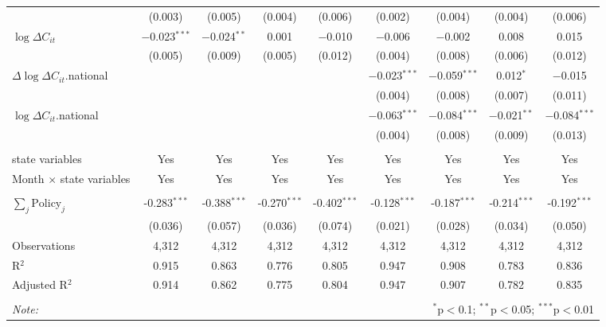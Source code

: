\begin{tabular}{@{\extracolsep{1pt}}lcccccccc}
  & (0.003) & (0.005) & (0.004) & (0.006) & (0.002) & (0.004) & (0.004) & (0.006) \\ 
  $\log \Delta C_{it}$ & $-$0.023$^{***}$ & $-$0.024$^{**}$ & 0.001 & $-$0.010 & $-$0.006 & $-$0.002 & 0.008 & 0.015 \\ 
  & (0.005) & (0.009) & (0.005) & (0.012) & (0.004) & (0.008) & (0.006) & (0.012) \\ 
  $\Delta \log \Delta C_{it}$.national &  &  &  &  & $-$0.023$^{***}$ & $-$0.059$^{***}$ & 0.012$^{*}$ & $-$0.015 \\ 
  &  &  &  &  & (0.004) & (0.008) & (0.007) & (0.011) \\ 
  $\log \Delta C_{it}$.national &  &  &  &  & $-$0.063$^{***}$ & $-$0.084$^{***}$ & $-$0.021$^{**}$ & $-$0.084$^{***}$ \\ 
  &  &  &  &  & (0.004) & (0.008) & (0.009) & (0.013) \\ 
 \hline \\[-1.8ex] 
state variables & Yes & Yes & Yes & Yes & Yes & Yes & Yes & Yes \\ 
Month $\times$ state variables & Yes & Yes & Yes & Yes & Yes & Yes & Yes & Yes \\ 
\hline \\[-1.8ex] 
$\sum_j \mathrm{Policy}_j$ & -0.283$^{***}$ & -0.388$^{***}$ & -0.270$^{***}$ & -0.402$^{***}$ & -0.128$^{***}$ & -0.187$^{***}$ & -0.214$^{***}$ & -0.192$^{***}$ \\ 
 & (0.036) & (0.057) & (0.036) & (0.074) & (0.021) & (0.028) & (0.034) & (0.050) \\ 
Observations & 4,312 & 4,312 & 4,312 & 4,312 & 4,312 & 4,312 & 4,312 & 4,312 \\ 
R$^{2}$ & 0.915 & 0.863 & 0.776 & 0.805 & 0.947 & 0.908 & 0.783 & 0.836 \\ 
Adjusted R$^{2}$ & 0.914 & 0.862 & 0.775 & 0.804 & 0.947 & 0.907 & 0.782 & 0.835 \\ 
\hline 
\hline \\[-1.8ex] 
\textit{Note:}  & \multicolumn{8}{r}{$^{*}$p$<$0.1; $^{**}$p$<$0.05; $^{***}$p$<$0.01} \\ 
\end{tabular} 